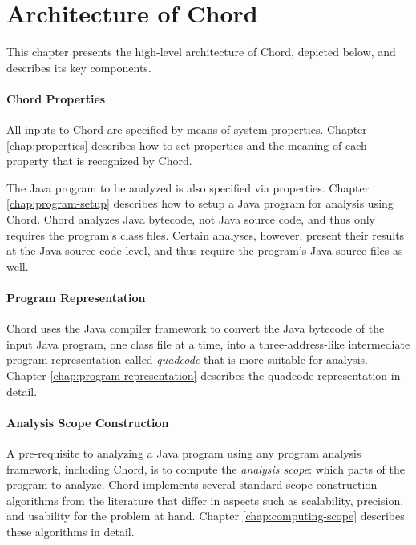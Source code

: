 \chapter{Architecture of Chord}
\label{chap:architecture}

This chapter presents the high-level architecture of Chord, depicted below, and describes its key components.

\begin{center}
\end{center}

\subsubsection*{Chord Properties}

All inputs to Chord are specified by means of system properties. 
Chapter \ref{chap:properties} describes how to set properties and the meaning of 
each property that is recognized by Chord.

The Java program to be analyzed is also specified via properties.
Chapter \ref{chap:program-setup} describes how to setup a Java program for analysis using Chord.
Chord analyzes Java bytecode, not Java source code, and thus only requires
the program's class files.  Certain analyses, however, present
their results at the Java source code level, and thus require the program's
Java source files as well.

\subsubsection*{Program Representation}

Chord uses the  Java compiler framework
to convert the Java bytecode of the input Java program, one class file at a time,
into a three-address-like intermediate program representation called {\it quadcode}
that is more suitable for analysis. Chapter \ref{chap:program-representation}
describes the quadcode representation in detail.

\subsubsection*{Analysis Scope Construction}

A pre-requisite to analyzing a Java program using any program analysis framework, including Chord, is
to compute the {\it analysis scope}: which parts of the program to analyze.  Chord implements
several standard scope construction algorithms from the literature that differ in aspects such as
scalability, precision, and usability for the problem at hand.  Chapter \ref{chap:computing-scope}
describes these algorithms in detail.

